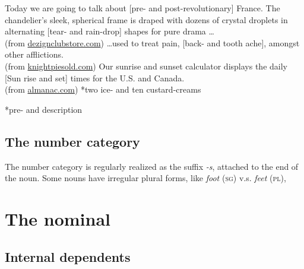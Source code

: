 \documentclass[UTF8, a4paper, oneside, scheme=plain, 12pt]{ctexbook}
\newcommand{\form}[1]{\emph{#1}}
\newcommand{\category}[1]{\textsc{#1}}
\begin{document}
\begin{exe}
    \ex\label{ex:np.nominal.coordination.1} Today we are going to talk about [pre- and post-revolutionary] France. 
    \ex\label{ex:np.nominal.coordination.3} The chandelier's sleek, spherical frame is draped with dozens of crystal droplets in alternating [tear- and rain-drop] shapes for pure drama \dots \\
    (from \href{https://dezignclubstore.com/products/clarissa-modern-round-chandelier}{dezignclubstore.com})
    \ex\label{ex:np.nominal.coordination.4} \dots used to treat pain, [back- and tooth ache], amongst other 
    afflictions. \\
    (from \href{https://www.knightpiesold.com/sites/pa/assets/File/Bakubung/App%20D4%20Terrestrial.pdf}{knightpiesold.com})
    \ex\label{ex:np.nominal.coordination.5} Our sunrise and sunset calculator displays the daily [Sun rise and set] times for the U.S. and Canada. \\
    (from \href{https://www.almanac.com/astronomy/sun-rise-and-set}{almanac.com})
    \ex\label{ex:np.nominal.coordination.7} *two ice- and ten custard-creams

    \ex\label{ex:np.nominal.coordination.9} *pre- and description 
\end{exe}



\subsection{The number category}\label{sec:np.noun.number}

The number category is regularly realized as the suffix \form{-s},
attached to the end of the noun.
Some nouns have irregular plural forms, like 
\form{foot} (\category{sg}) v.s. \form{feet} (\category{pl}),

\section{The nominal}\label{sec:np.nominal}

\subsection{Internal dependents}
\end{document}
